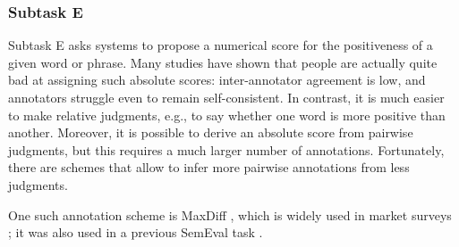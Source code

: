\documentclass[11pt]{article}
\begin{document}


%
%




\subsubsection{Subtask E}
\label{sec:E:annotation}

Subtask E asks systems to propose a numerical score
for the positiveness of a given word or phrase.
Many studies have shown that people are actually quite bad at assigning such absolute scores:
inter-annotator agreement is low, and annotators struggle even to remain self-consistent.
In contrast, it is much easier to make relative judgments,
e.g., to say whether one word is more positive than another.
Moreover, it is possible to derive an absolute score from pairwise judgments, but this requires a much larger number of annotations. Fortunately, there are schemes that allow to infer more pairwise annotations from less judgments.

One such annotation scheme is MaxDiff \cite{Louviere91},
which is widely used in market surveys \cite{Almquist_2009}; it was also used in a previous SemEval task
\cite{jurgens12}.
\end{document}
